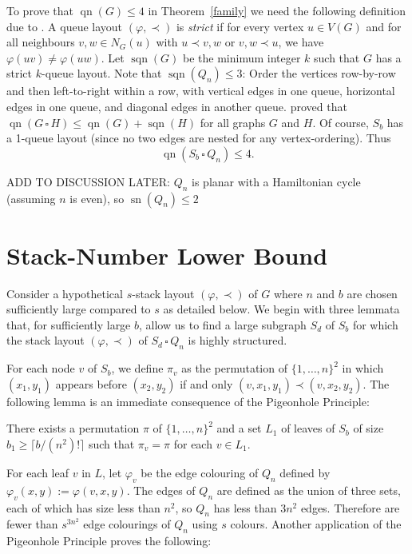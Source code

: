 \documentclass[kpfonts]{patmorin}
\DeclareMathOperator{\sn}{sn}
\DeclareMathOperator{\qn}{qn}
\DeclareMathOperator{\sqn}{sqn}
\renewcommand{\leq}{\leqslant}
\renewcommand{\ge}{\geqslant}
\newcommand{\CartProd}{\,\square\,}
\begin{document}
To prove that $\qn(G)\leq 4$ in Theorem~\ref{family} we need the following definition due to \citet{Wood-Queue-DMTCS05}. A queue layout $(\varphi,\prec)$ is \emph{strict} if for every vertex $u\in V(G)$ and for all neighbours $v,w\in N_G(u)$ with $u\prec v,w$ or $v,w \prec u$, we have $\varphi(uv)\neq \varphi(uw)$. Let $\sqn(G)$ be the minimum integer $k$ such that $G$ has a strict $k$-queue layout.
Note that $\sqn(Q_n) \leq 3$: Order the vertices row-by-row and then left-to-right within a row, with vertical edges in one queue, horizontal edges in one queue, and diagonal edges in another queue.
\citet{Wood-Queue-DMTCS05} proved that $\qn(G \CartProd H) \leq \qn(G) + \sqn(H)$ for all graphs $G$ and $H$. Of course, $S_b$ has a 1-queue layout (since no two edges are nested for any vertex-ordering). Thus
$$\qn(S_b \CartProd Q_n)\leq 4.$$


ADD TO DISCUSSION LATER:	$Q_n$ is planar with a Hamiltonian cycle (assuming $n$ is even), so $\sn(Q_n) \leq 2$


\section{Stack-Number Lower Bound}

Consider a hypothetical $s$-stack layout $(\varphi,\prec)$ of $G$ where $n$ and $b$ are chosen sufficiently large compared to $s$ as detailed below.  We begin with three lemmata that, for sufficiently large $b$, allow us to find a large subgraph $S_d$ of $S_b$ for which the stack layout $(\varphi,\prec)$ of $S_d\CartProd Q_n$ is highly structured.

For each node $v$ of $S_b$, we define $\pi_v$ as the permutation of $\{1,\ldots,n\}^2$ in which $(x_1,y_1)$ appears before $(x_2,y_2)$ if and only $(v,x_1,y_1)\prec (v,x_2,y_2)$.  The following lemma is an immediate consequence of the Pigeonhole Principle:

\begin{lem}
    There exists a permutation $\pi$ of $\{1,\ldots,n\}^2$ and a set $L_1$ of leaves of $S_b$ of size $b_1\ge \lceil b/(n^2)!\rceil$ such that $\pi_{v}=\pi$ for each $v\in L_1$.
\end{lem}


For each leaf $v$ in $L$, let $\varphi_v$ be the edge colouring of $Q_n$ defined by $\varphi_v(x,y):=\varphi(v,x,y)$.  The edges of $Q_n$ are defined as the union of three sets, each of which has size less than $n^2$, so $Q_n$ has less than $3n^2$ edges.  Therefore are fewer than $s^{3n^2}$ edge colourings of $Q_n$ using $s$ colours.  Another application of the Pigeonhole Principle proves the following:
\end{document}
